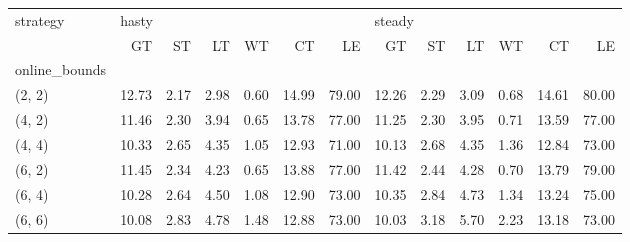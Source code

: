 \begin{tabular}{lrrrrrrrrrrrr}
\toprule
strategy & \multicolumn{6}{l}{hasty} & \multicolumn{6}{l}{steady} \\
{} &    GT &   ST &   LT &   WT &    CT &    LE &     GT &   ST &   LT &   WT &    CT &    LE \\
online\_bounds &       &      &      &      &       &       &        &      &      &      &       &       \\
\midrule
(2, 2)        & 12.73 & 2.17 & 2.98 & 0.60 & 14.99 & 79.00 &  12.26 & 2.29 & 3.09 & 0.68 & 14.61 & 80.00 \\
(4, 2)        & 11.46 & 2.30 & 3.94 & 0.65 & 13.78 & 77.00 &  11.25 & 2.30 & 3.95 & 0.71 & 13.59 & 77.00 \\
(4, 4)        & 10.33 & 2.65 & 4.35 & 1.05 & 12.93 & 71.00 &  10.13 & 2.68 & 4.35 & 1.36 & 12.84 & 73.00 \\
(6, 2)        & 11.45 & 2.34 & 4.23 & 0.65 & 13.88 & 77.00 &  11.42 & 2.44 & 4.28 & 0.70 & 13.79 & 79.00 \\
(6, 4)        & 10.28 & 2.64 & 4.50 & 1.08 & 12.90 & 73.00 &  10.35 & 2.84 & 4.73 & 1.34 & 13.24 & 75.00 \\
(6, 6)        & 10.08 & 2.83 & 4.78 & 1.48 & 12.88 & 73.00 &  10.03 & 3.18 & 5.70 & 2.23 & 13.18 & 73.00 \\
\bottomrule
\end{tabular}
